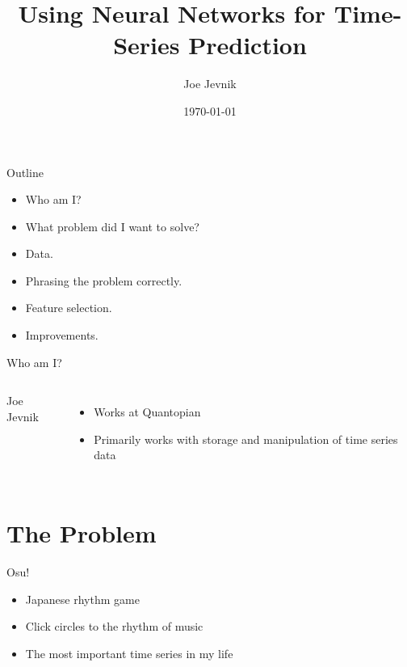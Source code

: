 \documentclass{beamer}
\title{Using Neural Networks for Time-Series Prediction}
\date{\today}
\author{Joe Jevnik}
\institute{PyData NYC 2017}
\begin{document}
\maketitle

\begin{frame}{Outline}
  \begin{itemize}
  \item<1-> Who am I?
  \item<2-> What problem did I want to solve?
  \item<3-> Data.
  \item<4-> Phrasing the problem correctly.
  \item<5-> Feature selection.
  \item<6-> Improvements.
  \end{itemize}
\end{frame}

\begin{frame}{Who am I?}
    \begin{columns}
    \begin{block}{Joe Jevnik}
    \end{block}

    \begin{itemize}
    \item Works at Quantopian
    \item Primarily works with storage and manipulation of time series data
    \end{itemize}
  \end{columns}
\end{frame}

\section{The Problem}

\begin{frame}{Osu!}
  \begin{itemize}
  \item<1-> Japanese rhythm game
  \item<2-> Click circles to the rhythm of music
  \item<3-> The most important time series in my life
  \end{itemize}
\end{frame}
\end{document}
